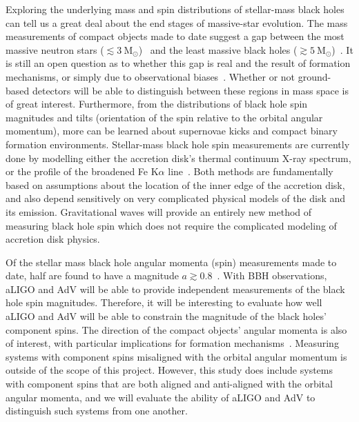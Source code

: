 \documentclass[12pt]{iopart}
\newcommand{\msun}{\ensuremath{\mathrm{M}_\odot}}
\begin{document}
Exploring the underlying mass and spin distributions of stellar-mass black
holes can tell us a great deal about the end stages of massive-star evolution.
The mass measurements of compact objects made to date suggest a gap between the
most massive neutron stars ($\lesssim 3~\msun$)~\cite{Kalogera:1996ci} and the
least massive black holes ($\gtrsim 5~\msun$)~\cite{Bailyn:1997xt}.  It is
still an open question as to whether this gap is real and the result of
formation mechanisms, or simply due to observational biases~\cite{Farr:2010tu}.
Whether or not ground-based detectors will be able to distinguish between
these regions in mass space is of great interest. Furthermore, from the
distributions of black hole spin magnitudes and tilts (orientation of the spin
relative to the orbital angular momentum), more can be learned about supernovae
kicks and compact binary formation environments.  Stellar-mass black hole spin
measurements are currently done by modelling either the accretion disk's thermal
continuum X-ray spectrum, or the profile of the broadened Fe K$\alpha$
line~\cite{McClintock:2011zq}.  Both methods are fundamentally based on
assumptions about the location of the inner edge of the accretion disk, and
also depend sensitively on very complicated physical models of the disk and its
emission.  Gravitational waves will provide an entirely new method of
measuring black hole spin which does not require the complicated modeling of
accretion disk physics. 

Of the stellar mass black hole angular momenta (spin) measurements made to 
date, half are found to have a magnitude
$a\gtrsim0.8$~\cite{McClintock:2011zq}. With BBH observations, aLIGO and AdV 
will be able to provide independent measurements of the black hole spin 
magnitudes. Therefore, it will be interesting
to evaluate how well aLIGO and AdV will be able to constrain the magnitude of 
the black holes' component spins.
The direction of the compact objects' angular momenta is also
of interest, with particular implications for formation
mechanisms~\cite{Belczynski:2007xg}.  Measuring systems with component
spins misaligned with the orbital angular momentum is outside of the
scope of this project. However, this study does include systems with
component spins that are both aligned and anti-aligned with the
orbital angular momenta, and we will evaluate the ability of aLIGO and AdV to
distinguish such systems from one another.
\end{document}
